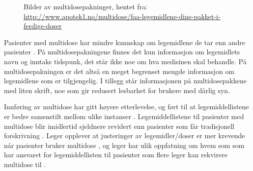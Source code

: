 \begin{figure}[h]
\centering
{}
\caption{Bilder av multidosepakninger, hentet fra: \url{http://www.apotek1.no/multidose/faa-legemidlene-dine-pakket-i-ferdige-doser}}\label{fig:multidose}
\end{figure}

Pasienter med multidose har mindre kunnskap om legemidlene de tar enn andre pasienter \citep{Kwint01092013}. På multidosepakningene finnes det kun informasjon om legemidlets navn og inntaks tidspunk, det står ikke noe om hva medisinen skal behandle. På multidosepakningen er det altså en meget begrenset mengde informasjon om legemidlene som er tilgjengelig. I tillegg står informasjonen på multidosepakkene med liten skrift, noe som gir redusert lesbarhet for brukere med dårlig syn. 

Innføring av multidose har gitt høyere etterlevelse, og ført til at legemiddellistene er bedre samenstilt mellom ulike instanser \citep{Wekre01102010}. Legemiddellistene til pasienter med multidose blir imidlertid sjeldnere revidert enn pasienter som får tradisjonell forskrivning \citep{mutiDose,Larsen2007265}. Leger opplever at justeringer av legemidler/doser er mer krevende når pasienter bruker multidose \citep{doi:10.3109/02813432.2011.554002}, og leger har ulik oppfatning om hvem som som har ansvaret for legemiddellisten til pasienter som flere leger kan rekvirere multidose til \citep{Rahmner01012010, Wekre01082012}.

